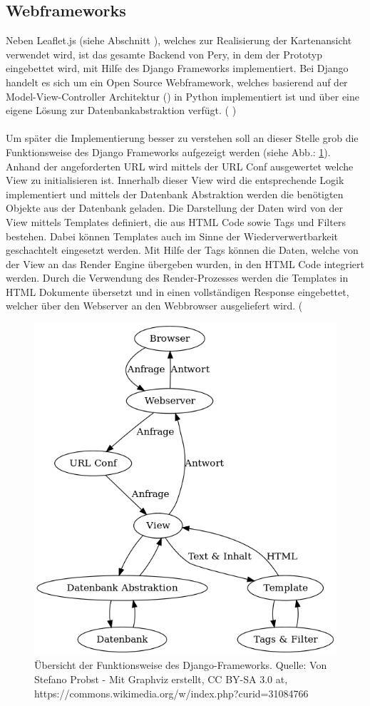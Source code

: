 \documentclass[Bachelorarbeit.tex]{subfiles}
\begin{document}
\subsection*{Webframeworks}
Neben Leaflet.js (siehe Abschnitt ), welches zur Realisierung der Kartenansicht verwendet wird, ist das gesamte Backend von Pery, in dem der Prototyp eingebettet wird, mit Hilfe des Django Frameworks implementiert. 
Bei Django handelt es sich um ein Open Source Webframework, welches basierend auf der Model-View-Controller Architektur (\cite[vgl.][]{DjangoMVC}) in Python implementiert ist und über eine eigene Lösung zur Datenbankabstraktion verfügt. (\cite[vgl.][]{DjangoDoc} \cite[sowie][- sekundär Quelle]{DjangoStackoverflow})\\
\\
Um später die Implementierung besser zu verstehen soll an dieser Stelle grob die Funktionsweise des Django Frameworks aufgezeigt werden (siehe Abb.: \ref{fig:MTV_Django}).
Anhand der angeforderten \ac{URL} wird mittels der \ac{URL Conf} ausgewertet welche View zu initialisieren ist.
Innerhalb dieser View wird die entsprechende Logik implementiert und mittels
der Datenbank Abstraktion werden die benötigten Objekte aus der Datenbank geladen.
Die Darstellung der Daten wird von der View mittels Templates definiert, die  aus \ac{HTML} Code sowie Tags und Filters bestehen. 
Dabei können Templates auch im Sinne der Wiederverwertbarkeit geschachtelt eingesetzt werden. 
Mit Hilfe der Tags können die Daten, welche von der View an das Render Engine übergeben wurden, in den \ac{HTML} Code integriert werden.
Durch die Verwendung des Render-Prozesses werden die Templates in \ac{HTML} Dokumente übersetzt und in einen vollständigen Response eingebettet, welcher über den Webserver an den Webbrowser ausgeliefert wird. (\cite[vgl.][]{DjangoDoc}

\begin{figure}[H]
\centering
\includegraphics[width=0.7\linewidth]{img/Implementierung/MTV_Django}
\caption[Funktionsweise des Django-Frameworks]{Übersicht der Funktionsweise des Django-Frameworks. Quelle: Von Stefano Probst - Mit Graphviz erstellt, CC BY-SA 3.0 at, https://commons.wikimedia.org/w/index.php?curid=31084766}
\label{fig:MTV_Django}
\end{figure}
\end{document}
